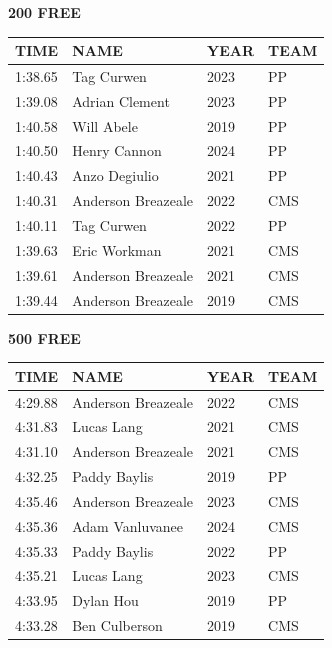 \begin{table}[H]
\centering
\begin{minipage}[t]{0.48\textwidth}
\centering
\textbf{200 FREE}\\[0.1cm]
\begin{tabular}{@{}p{1.8cm}p{2.8cm}p{1.2cm}p{1.4cm}@{}}
\hline
    \textbf{TIME} & \textbf{NAME} & \textbf{YEAR} & \textbf{TEAM} \\
\hline
    1:38.65 & Tag Curwen & 2023 & PP \\
    1:39.08 & Adrian Clement & 2023 & PP \\
    1:40.58 & Will Abele & 2019 & PP \\
    1:40.50 & Henry Cannon & 2024 & PP \\
    1:40.43 & Anzo Degiulio & 2021 & PP \\
    1:40.31 & Anderson Breazeale & 2022 & CMS \\
    1:40.11 & Tag Curwen & 2022 & PP \\
    1:39.63 & Eric Workman & 2021 & CMS \\
    1:39.61 & Anderson Breazeale & 2021 & CMS \\
    1:39.44 & Anderson Breazeale & 2019 & CMS \\
\hline
\end{tabular}
\end{minipage}\hfill
\begin{minipage}[t]{0.48\textwidth}
\centering
\textbf{500 FREE}\\[0.1cm]
\begin{tabular}{@{}p{1.8cm}p{2.8cm}p{1.2cm}p{1.4cm}@{}}
\hline
    \textbf{TIME} & \textbf{NAME} & \textbf{YEAR} & \textbf{TEAM} \\
\hline
    4:29.88 & Anderson Breazeale & 2022 & CMS \\
    4:31.83 & Lucas Lang & 2021 & CMS \\
    4:31.10 & Anderson Breazeale & 2021 & CMS \\
    4:32.25 & Paddy Baylis & 2019 & PP \\
    4:35.46 & Anderson Breazeale & 2023 & CMS \\
    4:35.36 & Adam Vanluvanee & 2024 & CMS \\
    4:35.33 & Paddy Baylis & 2022 & PP \\
    4:35.21 & Lucas Lang & 2023 & CMS \\
    4:33.95 & Dylan Hou & 2019 & PP \\
    4:33.28 & Ben Culberson & 2019 & CMS \\
\hline
\end{tabular}
\end{minipage}
\end{table}

